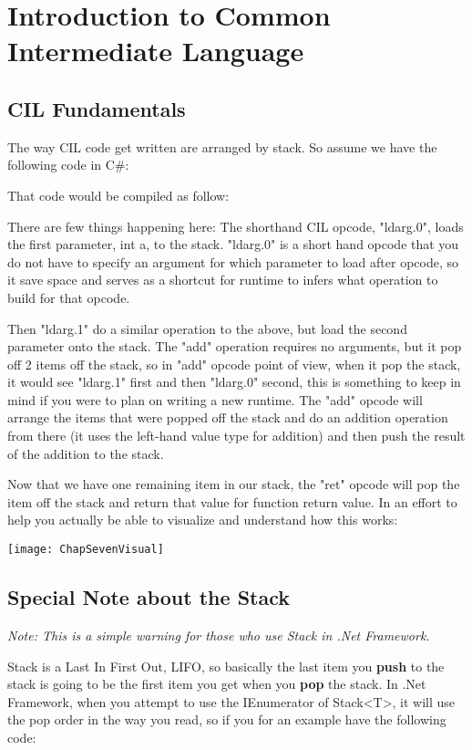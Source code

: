 \chapter{Introduction to Common Intermediate Language}
\section{CIL Fundamentals}
The way CIL code get written are arranged by stack. So assume we have the following code in C\#:

That code would be compiled as follow:


There are few things happening here:
The shorthand CIL opcode, "ldarg.0", loads the first parameter, int a, to the stack. "ldarg.0" is a short hand opcode that you do not have to specify an argument for which parameter to load after opcode, so it save space and serves as a shortcut for runtime to infers what operation to build for that opcode.

Then "ldarg.1" do a similar operation to the above, but load the second parameter onto the stack. The "add" operation requires no arguments, but it pop off 2 items off the stack, so in "add" opcode point of view, when it pop the stack, it would see "ldarg.1" first and then "ldarg.0" second, this is something to keep in mind if you were to plan on writing a new runtime. The "add" opcode will arrange the items that were popped off the stack and do an addition operation from there (it uses the left-hand value type for addition) and then push the result of the addition to the stack.

Now that we have one remaining item in our stack, the "ret" opcode will pop the item off the stack and return that value for function return value.
\newpage
In an effort to help you actually be able to visualize and understand how this works:

\texttt{[image: ChapSevenVisual]}

\section{Special Note about the Stack}
\textit{Note: This is a simple warning for those who use Stack in .Net Framework.}

Stack is a Last In First Out, LIFO, so basically the last item you \textbf{push} to the stack is going to be the first item you get when you \textbf{pop} the stack. In .Net Framework, when you attempt to use the IEnumerator of Stack<T>, it will use the pop order in the way you read, so if you for an example have the following code:

